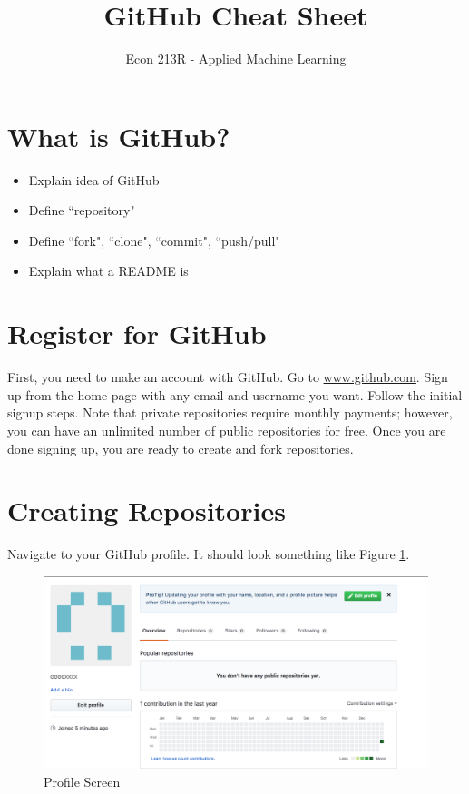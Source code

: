 \documentclass[11pt,a4paper]{article}
\title{GitHub Cheat Sheet}
\date{}
\author{Econ 213R - Applied Machine Learning}
\begin{document}
\vspace*{-75pt}
    {\let\newpage\relax\maketitle}
    
\section*{What is GitHub?}
\begin{itemize}
\item Explain idea of GitHub
\item Define ``repository"
\item Define ``fork", ``clone", ``commit", ``push/pull"
\item Explain what a README is
\end{itemize}
    
\section*{Register for GitHub}
First, you need to make an account with GitHub.
Go to \url{www.github.com}. 
Sign up from the home page with any email and username you want.
Follow the initial signup steps.
Note that private repositories require monthly payments; however, you can have an unlimited number of public repositories for free.
Once you are done signing up, you are ready to create and fork repositories.

\section*{Creating Repositories}
Navigate to your GitHub profile.
It should look something like Figure \ref{fig:init-prof}.

\begin{figure}[h]
\centering
\includegraphics[width=.7\textwidth]{figures/init_profile.png}
\caption{Profile Screen}
\label{fig:init-prof}
\end{figure}
\end{document}
